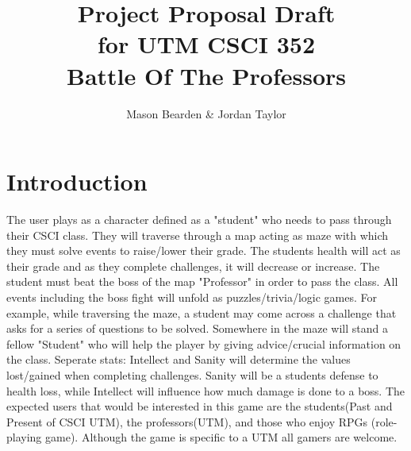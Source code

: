 \documentclass[10pt,conference,onecolumn,compsoc]{IEEEtran}
\begin{document}
\title{Project Proposal Draft\\ for UTM CSCI 352\\Battle Of The Professors}
%
%


\author{Mason Bearden & Jordan Taylor%
}



\maketitle



\IEEEdisplaynontitleabstractindextext

\IEEEpeerreviewmaketitle



\section{Introduction}



The user plays as a character defined as a "student" who needs to pass through their CSCI class. They will traverse through a map acting as maze with which they must solve events to raise/lower their grade. The students health will act as their grade and as they complete challenges, it will decrease or increase. The student must beat the boss of the map "Professor" in order to pass the class.
	 All events including the boss fight will unfold as puzzles/trivia/logic games. For example, while traversing the maze, a student may come across a challenge that asks for a series of questions to be solved. Somewhere in the maze will stand a fellow "Student" who will help the player by giving advice/crucial information on the class. Seperate stats: Intellect and Sanity will determine the values lost/gained when completing challenges. Sanity will be a students defense to health loss, while Intellect will influence how much damage is done to a boss. The expected users that would be interested in this game are the students(Past and Present of CSCI UTM), the professors(UTM), and those who enjoy RPGs (role-playing game). Although the game is specific to a UTM all gamers are welcome.
\end{document}
